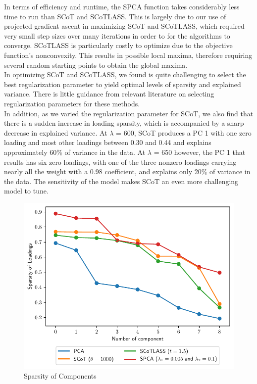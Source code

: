 \documentclass[11pt,letterpaper]{report}
\begin{document}
In terms of efficiency and runtime, the SPCA function takes considerably less time to run than SCoT and SCoTLASS. This is largely due to our use of projected gradient ascent in maximizing SCoT and SCoTLASS, which required very small step sizes over many iterations in order to for the algorithms to converge. SCoTLASS is particularly costly to optimize due to the objective function's nonconvexity. This results in possible local maxima, therefore requiring several random starting points to obtain the global maxima.\\

In optimizing SCoT and SCoTLASS, we found is quite challenging to select the best regularization parameter to yield optimal levels of sparsity and explained variance. There is little guidance from relevant literature on selecting regularization parameters for these methods.\\

In addition, as we varied the regularization parameter for SCoT, we also find that there is a sudden increase in loading sparsity, which is accompanied by a sharp decrease in explained variance. At $\lambda$ = 600, SCoT produces a PC 1 with one zero loading and most other loadings between 0.30 and 0.44 and explains approximately 60\% of variance in the data. At $\lambda$ = 650 however, the PC 1 that results has six zero loadings, with one of the three nonzero loadings carrying nearly all the weight with a 0.98 coefficient, and explains only 20\% of variance in the data. The sensitivity of the model makes SCoT an even more challenging model to tune.

\begin{figure}[htpb!]\centering
    \caption{Sparsity of Components}
    \label{fig:sparComp}
    \includegraphics[scale = 0.5]{"../Figures/sparsityOfComponents.pdf"}
\end{figure}
\end{document}
